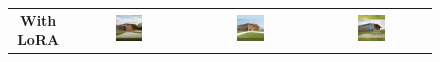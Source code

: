 \begin{figure}[H]
  \centering
  {\footnotesize
  \renewcommand{\arraystretch}{1.1}
  \setlength{\tabcolsep}{4pt}
  \begin{tabular}{c c c c}
    \textbf{With LoRA} &
    \includegraphics[width=0.25\textwidth]{Images/Results/Architect-B_unstructured-phase/generated_images/4/Met_lora_00020_.png} &
    \includegraphics[width=0.25\textwidth]{Images/Results/Architect-B_unstructured-phase/generated_images/4/Met_lora_00021_.png} &
    \includegraphics[width=0.25\textwidth]{Images/Results/Architect-B_unstructured-phase/generated_images/4/Met_lora_00022_.png} \\


\end{tabular}}
\end{figure}
